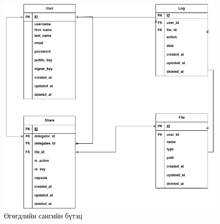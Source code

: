 \begin{figure}[H]
    \centering
    \includegraphics[scale=0.5]{Figures/database.drawio.png}
    \caption[pyUmbral]{Өгөгдлийн сангийн бүтэц}
    \label{fig:database}
\end{figure}

